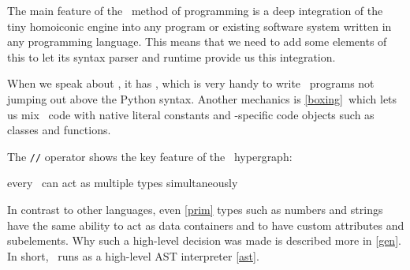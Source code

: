 {}\label{ops}

The main feature of the \mel{}\ method of
programming is a deep integration of the tiny homoiconic 
engine into any program or existing software system written in any programming
language. This means that we need to add some elements of this  to let its syntax parser and runtime provide us this
integration.

\medskip
When we speak about \py, it has , which is very handy
to write \mel\ programs not jumping out above the Python syntax. Another
mechanics is  \ref{boxing}\ which lets us mix \mel\ code with
native literal constants and \py-specific code objects such as classes and
functions.

\clearpage
{}

The \verb|//| operator shows the key feature of the \mel\ hypergraph:
\begin{framed}\noindent\centering every \ can act as multiple
 types simultaneously
\end{framed}
In contrast to other languages, even  \ref{prim} types such as
numbers and strings have the same ability to act as data containers and to have
custom attributes and subelements. Why such a high-level decision was made is
described more in \ref{gen}. In short, \mel\ runs as a high-level AST
interpreter \ref{ast}.
